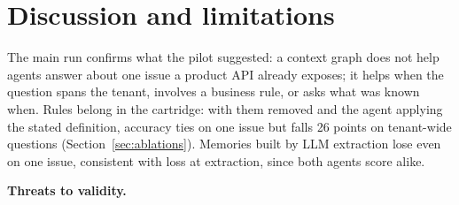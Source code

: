 \documentclass{article}
\begin{document}
\section{Discussion and limitations}
\label{sec:discussion}

The main run confirms what the pilot suggested: a context graph does not help agents answer about one issue a product API already exposes; it helps when the question spans the tenant, involves a business rule, or asks what was known when. Rules belong in the cartridge: with them removed and the agent applying the stated definition, accuracy ties on one issue but falls 26 points on tenant-wide questions (Section~\ref{sec:ablations}). Memories built by LLM extraction lose even on one issue, consistent with loss at extraction, since both agents score alike.

\textbf{Threats to validity.}
\end{document}
